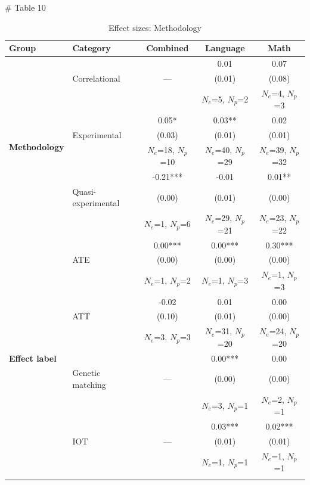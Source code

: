 # Table 10

\renewcommand{\arraystretch}{0.9} %
\setlength{\tabcolsep}{5pt}       %
\small                            %

\begin{table}[htbp]
\centering
\caption{Effect sizes: Methodology}
\medskip
\begin{tabular*}{\linewidth}{@{\extracolsep{\fill}} l l c c c @{}}
\toprule
\textbf{Group} & \textbf{Category} & \textbf{Combined} & \textbf{Language} & \textbf{Math} \\
\midrule
\multirow{9}{*}{\textbf{Methodology}}
  &  &  & 0.01 & 0.07 \\
  & Correlational & --- & (0.01) & (0.08) \\
  &  &  & $N_e$=5, $N_p$=2 & $N_e$=4, $N_p$=3 \\
\cmidrule(lr){2-5}
  &  & 0.05* & 0.03** & 0.02 \\
  & Experimental & (0.03) & (0.01) & (0.01) \\
  &  & $N_e$=18, $N_p$=10 & $N_e$=40, $N_p$=29 & $N_e$=39, $N_p$=32 \\
\cmidrule(lr){2-5}
  &  & -0.21*** & -0.01 & 0.01** \\
  & Quasi-experimental & (0.00) & (0.01) & (0.00) \\
  &  & $N_e$=1, $N_p$=6 & $N_e$=29, $N_p$=21 & $N_e$=23, $N_p$=22 \\
\midrule
\multirow{27}{*}{\textbf{Effect label}}
  &  & 0.00*** & 0.00*** & 0.30*** \\
  & ATE & (0.00) & (0.00) & (0.00) \\
  &  & $N_e$=1, $N_p$=2 & $N_e$=1, $N_p$=3 & $N_e$=1, $N_p$=3 \\
\cmidrule(lr){2-5}
  &  & -0.02 & 0.01 & 0.00 \\
  & ATT & (0.10) & (0.01) & (0.00) \\
  &  & $N_e$=3, $N_p$=3 & $N_e$=31, $N_p$=20 & $N_e$=24, $N_p$=20 \\
\cmidrule(lr){2-5}
  &  &  & 0.00*** & 0.00 \\
  & Genetic matching & --- & (0.00) & (0.00) \\
  &  &  & $N_e$=3, $N_p$=1 & $N_e$=2, $N_p$=1 \\
\cmidrule(lr){2-5}
  &  &  & 0.03*** & 0.02*** \\
  & IOT & --- & (0.01) & (0.01) \\
  &  &  & $N_e$=1, $N_p$=1 & $N_e$=1, $N_p$=1 \\
\cmidrule(lr){2-5}

\end{tabular*}
\end{table}
